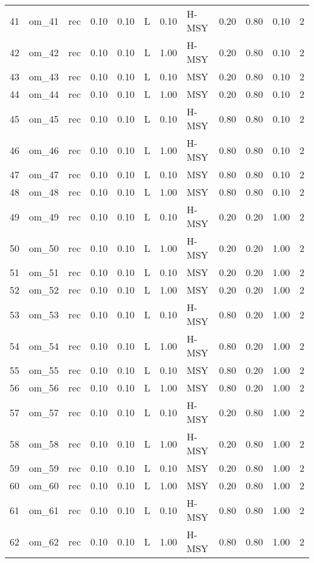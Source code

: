 \begin{table}[ht]
\begin{tabular}{rllrrlrlrrrr}
  41 & om\_41 & rec & 0.10 & 0.10 & L & 0.10 & H-MSY & 0.20 & 0.80 & 0.10 &   2 \\ 
  42 & om\_42 & rec & 0.10 & 0.10 & L & 1.00 & H-MSY & 0.20 & 0.80 & 0.10 &   2 \\ 
  43 & om\_43 & rec & 0.10 & 0.10 & L & 0.10 & MSY & 0.20 & 0.80 & 0.10 &   2 \\ 
  44 & om\_44 & rec & 0.10 & 0.10 & L & 1.00 & MSY & 0.20 & 0.80 & 0.10 &   2 \\ 
  45 & om\_45 & rec & 0.10 & 0.10 & L & 0.10 & H-MSY & 0.80 & 0.80 & 0.10 &   2 \\ 
  46 & om\_46 & rec & 0.10 & 0.10 & L & 1.00 & H-MSY & 0.80 & 0.80 & 0.10 &   2 \\ 
  47 & om\_47 & rec & 0.10 & 0.10 & L & 0.10 & MSY & 0.80 & 0.80 & 0.10 &   2 \\ 
  48 & om\_48 & rec & 0.10 & 0.10 & L & 1.00 & MSY & 0.80 & 0.80 & 0.10 &   2 \\ 
  49 & om\_49 & rec & 0.10 & 0.10 & L & 0.10 & H-MSY & 0.20 & 0.20 & 1.00 &   2 \\ 
  50 & om\_50 & rec & 0.10 & 0.10 & L & 1.00 & H-MSY & 0.20 & 0.20 & 1.00 &   2 \\ 
  51 & om\_51 & rec & 0.10 & 0.10 & L & 0.10 & MSY & 0.20 & 0.20 & 1.00 &   2 \\ 
  52 & om\_52 & rec & 0.10 & 0.10 & L & 1.00 & MSY & 0.20 & 0.20 & 1.00 &   2 \\ 
  53 & om\_53 & rec & 0.10 & 0.10 & L & 0.10 & H-MSY & 0.80 & 0.20 & 1.00 &   2 \\ 
  54 & om\_54 & rec & 0.10 & 0.10 & L & 1.00 & H-MSY & 0.80 & 0.20 & 1.00 &   2 \\ 
  55 & om\_55 & rec & 0.10 & 0.10 & L & 0.10 & MSY & 0.80 & 0.20 & 1.00 &   2 \\ 
  56 & om\_56 & rec & 0.10 & 0.10 & L & 1.00 & MSY & 0.80 & 0.20 & 1.00 &   2 \\ 
  57 & om\_57 & rec & 0.10 & 0.10 & L & 0.10 & H-MSY & 0.20 & 0.80 & 1.00 &   2 \\ 
  58 & om\_58 & rec & 0.10 & 0.10 & L & 1.00 & H-MSY & 0.20 & 0.80 & 1.00 &   2 \\ 
  59 & om\_59 & rec & 0.10 & 0.10 & L & 0.10 & MSY & 0.20 & 0.80 & 1.00 &   2 \\ 
  60 & om\_60 & rec & 0.10 & 0.10 & L & 1.00 & MSY & 0.20 & 0.80 & 1.00 &   2 \\ 
  61 & om\_61 & rec & 0.10 & 0.10 & L & 0.10 & H-MSY & 0.80 & 0.80 & 1.00 &   2 \\ 
  62 & om\_62 & rec & 0.10 & 0.10 & L & 1.00 & H-MSY & 0.80 & 0.80 & 1.00 &   2 \\ 

\end{tabular}
\end{table}
